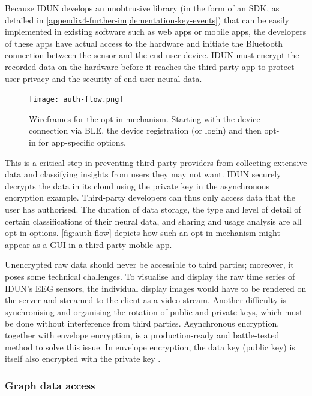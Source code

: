 Because IDUN develops an unobtrusive library (in the form of an SDK, as detailed in \autoref{appendix4-further-implementation-key-events}) that can be easily implemented in existing software such as web apps or mobile apps, the developers of these apps have actual access to the hardware and initiate the Bluetooth connection between the sensor and the end-user device. IDUN must encrypt the recorded data on the hardware before it reaches the third-party app to protect user privacy and the security of end-user neural data.

\begin{figure}[!ht]
  \centering
  \texttt{[image: auth-flow.png]}
  \caption{Wireframes for the opt-in mechanism. Starting with the device connection via BLE, the device registration (or login) and then opt-in for app-specific options.}
  \label{fig:auth-flow}
\end{figure}

This is a critical step in preventing third-party providers from collecting extensive data and classifying insights from users they may not want. IDUN securely decrypts the data in its cloud using the private key in the asynchronous encryption example. Third-party developers can thus only access data that the user has authorised. The duration of data storage, the type and level of detail of certain classifications of their neural data, and sharing and usage analysis are all opt-in options. \autoref{fig:auth-flow} depicts how such an opt-in mechanism might appear as a GUI in a third-party mobile app.

Unencrypted raw data should never be accessible to third parties; moreover, it poses some technical challenges. To visualise and display the raw time series of IDUN’s EEG sensors, the individual display images would have to be rendered on the server and streamed to the client as a video stream. Another difficulty is synchronising and organising the rotation of public and private keys, which must be done without interference from third parties. Asynchronous encryption, together with envelope encryption, is a production-ready and battle-tested method to solve this issue. In envelope encryption, the data key (public key) is itself also encrypted with the private key \citep{google_cloud_envelope_nodate}.

\subsubsection{Graph data access}
\label{chapter5-graph-data-access}

